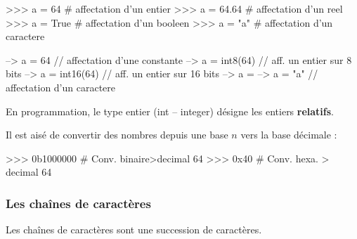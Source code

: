 \documentclass[11pt,oneside]{article}
\begin{document}
\begin{exemple}
\begin{minipage}[c]{.45\linewidth}
\begin{py}
\begin{python}
>>> a = 64 # affectation d'un entier
>>> a = 64.64 # affectation d'un reel
>>> a = True # affectation d'un booleen
>>> a = "a" # affectation d'un caractere
\end{python}
\end{py}
\end{minipage}\hfill
\begin{minipage}[c]{.5\linewidth}
\begin{sci}
\begin{scilab}
--> a = 64 // affectation d'une constante
--> a = int8(64) // aff. un entier sur 8 bits
--> a = int16(64) // aff. un entier sur 16 bits
--> a = %
--> a = "a" // affectation d'un caractere
\end{scilab}
\end{sci}
\end{minipage}
\end{exemple}

\begin{rem}
En programmation, le type entier (\textsf{int} -- \textsf{integer}) désigne les entiers \textbf{relatifs}.
\end{rem}

\begin{exemple}
Il est aisé de convertir des nombres depuis une base $n$ vers la base décimale : 

\begin{minipage}[c]{.45\linewidth}
\begin{py}
\begin{python}
>>> 0b1000000 # Conv. binaire>decimal
	64
>>> 0x40 # Conv. hexa. > decimal
	64
\end{python}
\end{py}
\end{minipage}\hfill
\begin{minipage}[c]{.45\linewidth}
\end{minipage}
\end{exemple}




\subsubsection{Les chaînes de caractères}
\begin{defi}
Les chaînes de caractères sont une succession de caractères. 
\end{defi}
\end{document}
